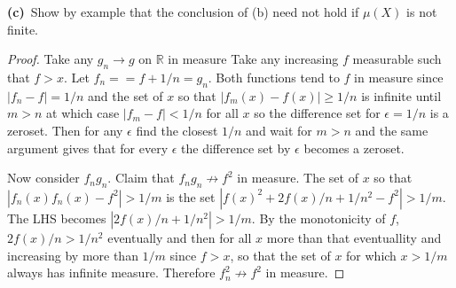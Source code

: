\documentclass[11pt]{amsart}
\theoremstyle{definition}
\numberwithin{theorem}{section}
\numberwithin{definition}{section}
\numberwithin{equation}{section}
\begin{document}
{\bf (c)}\  Show by example that the conclusion of (b) need not hold
if $\mu(X)$ is not finite.
\begin{proof}
	Take any $g_n \to g$ on $\mathbb{R}$ in measure Take any increasing $f$ measurable such that $f>x$. Let $f_n = = f + 1/n = g_n$. Both functions tend to
	$f$ in measure since $|f_n -f| = 1/n$ and the set of $x$ so that $|f_m(x) - f(x)| \geq 1/n$ is infinite until $m > n$ at which case $|f_m -f| < 1/n$
	for all $x$ so the difference set for $\epsilon = 1/n$ is a zeroset. Then for any $\epsilon$ find the closest $1/n$ and wait for $m >n$ and the same argument gives that for every $\epsilon$ the difference set by $\epsilon$ becomes a zeroset.

	Now consider $f_ng_n$. Claim that $f_ng_n \not\to f^2$ in measure. The set of $x$ so that $|f_n(x)f_n(x) - f^2| > 1/m$ is the set 
	$|f(x)^2 + 2f(x)/n + 1/n^2  - f^2| > 1/m$. The LHS becomes $|2f(x)/n + 1/n^2| > 1/m.$ By the monotonicity of $f$, $2f(x)/n > 1/n^2$ eventually and
	then for all $x$ more than that eventuallity and increasing by more than $1/m$ since $f > x$, so that the set of $x$ for which $x > 1/m$ always has infinite measure. Therefore $f_n^2 \not\to f^2$ in measure.

\end{proof}
\end{document}
